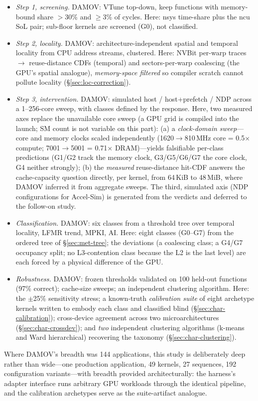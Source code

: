 \begin{itemize}
\item \emph{Step 1, screening.} DAMOV: VTune top-down, keep functions with
memory-bound share $>$30\% and $\geq$3\% of cycles. Here: nsys time-share
plus the ncu SoL pair; sub-floor kernels are screened (G0), not classified.
\item \emph{Step 2, locality.} DAMOV: architecture-independent spatial and
temporal locality from CPU address streams, clustered. Here: NVBit per-warp
traces $\rightarrow$ reuse-distance CDFs (temporal) and sectors-per-warp
coalescing (the GPU's spatial analogue), \emph{memory-space filtered} so
compiler scratch cannot pollute locality (\S\ref{sec:loc-correction}).
\item \emph{Step 3, intervention.} DAMOV: simulated host / host+prefetch /
NDP across a 1--256-core sweep, with classes defined by the response. Here,
two measured axes replace the unavailable core sweep (a GPU grid is compiled
into the launch; SM count is not variable on this part): (a) a
\emph{clock-domain sweep}---core and memory clocks scaled independently
(1620$\rightarrow$810\,MHz core = 0.5$\times$ compute; 7001$\rightarrow$5001
= 0.71$\times$ DRAM)---yields falsifiable per-class predictions (G1/G2 track
the memory clock, G3/G5/G6/G7 the core clock, G4 neither strongly); (b) the
\emph{measured} reuse-distance hit-CDF answers the cache-capacity question
directly, per kernel, from 64\,KiB to 48\,MiB, where DAMOV inferred it from
aggregate sweeps. The third, simulated axis (NDP configurations for
Accel-Sim) is generated from the verdicts and deferred to the follow-on
study.
\item \emph{Classification.} DAMOV: six classes from a threshold tree over
temporal locality, LFMR trend, MPKI, AI. Here: eight classes (G0--G7) from
the ordered tree of \S\ref{sec:met-tree}; the deviations (a coalescing
class; a G4/G7 occupancy split; no L3-contention class because the L2 is the
last level) are each forced by a physical difference of the GPU.
\item \emph{Robustness.} DAMOV: frozen thresholds validated on 100 held-out
functions (97\% correct); cache-size sweeps; an independent clustering
algorithm. Here: the $\pm$25\% sensitivity stress; a known-truth
\emph{calibration suite} of eight archetype kernels written to embody each
class and classified blind (\S\ref{sec:char-calibration}); cross-device
agreement across two microarchitectures (\S\ref{sec:char-crossdev}); and
\emph{two} independent clustering algorithms (k-means and Ward hierarchical)
recovering the taxonomy (\S\ref{sec:char-clustering}).
\end{itemize}

Where DAMOV's breadth was 144 applications, this study is deliberately
deep rather than wide---one production application, 49 kernels, 27
sequences, 192 configuration variants---with breadth provided
architecturally: the harness's adapter interface runs arbitrary GPU
workloads through the identical pipeline, and the calibration archetypes
serve as the suite-artifact analogue.
